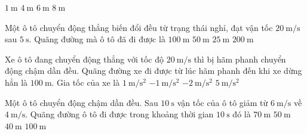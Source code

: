 \begin{ex}
	\choice
	{$\SI{1}{\meter}$}
	{\True $\SI{4}{\meter}$}
	{$\SI{6}{\meter}$}
	{$\SI{8}{\meter}$}
\end{ex}

\begin{ex}
	Một ô tô chuyển động thẳng biến đổi đều từ trạng thái nghỉ, đạt vận tốc $\SI{20}{\meter/\second}$ sau $\SI{5}{\second}$. Quãng đường mà ô tô đã đi được là
	\choice
	{$\SI{100}{\meter}$}
	{\True $\SI{50}{\meter}$}
	{$\SI{25}{\meter}$}
	{$\SI{200}{\meter}$}
\end{ex}

\begin{ex}
	Xe ô tô đang chuyển động thẳng với tốc độ $\SI{20}{\meter/\second}$ thì bị hãm phanh chuyển động chậm dần đều. Quãng đường xe đi được từ lúc hãm phanh đến khi xe dừng hẳn là $\SI{100}{\meter}$. Gia tốc của xe là
	\choice
	{$\SI{1}{\meter/\second^2}$}
	{$\SI{-1}{\meter/\second^2}$}
	{\True $\SI{-2}{\meter/\second^2}$}
	{$\SI{5}{\meter/\second^2}$}
\end{ex}

\begin{ex}
	Một ô tô chuyển động chậm dần đều. Sau $\SI{10}{\second}$ vận tốc của ô tô giảm từ $\SI{6}{\meter/\second}$ về $\SI{4}{\meter/\second}$. Quãng đường ô tô đi được trong khoảng thời gian $\SI{10}{\second}$ đó là
	\choice
	{$\SI{70}{\meter}$}
	{\True $\SI{50}{\meter}$}
	{$\SI{40}{\meter}$}
	{$\SI{100}{\meter}$}
\end{ex}

